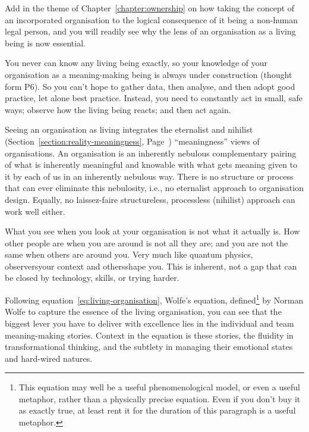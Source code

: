 Add in the theme of Chapter~\ref{chapter:ownership} on how taking the concept of an incorporated organisation to the logical consequence of it being a non-human legal person, and you will readily see why the lens of an organisation as a living being is now essential. 


You never can know any living being exactly, so your knowledge of your organisation as a meaning\hyp{}making being is always under construction (thought form P6). So you can't hope to gather data, then analyse, and then adopt good practice, let alone best practice. Instead, you need to constantly act in small, safe ways; observe how the living being reacts; and then act again\cite{snowden-cynefin, cynefin}.


Seeing an organisation as living integrates the eternalist and nihilist (Section~\ref{section:reality-meaningness}, Page~\pageref{section:reality-meaningness}) “meaningness” views of organisations. An organisation is an inherently nebulous complementary pairing of what is inherently meaningful and knowable with what gets meaning given to it by each of us in an inherently nebulous way. There is no structure or process that can ever eliminate this nebulosity, i.e., no eternalist approach to organisation design. Equally, no laissez-faire structureless, processless (nihilist) approach can work well either.


What you see when you look at your organisation is not what it actually is. How other people are when you are around is not all they are; and you are not the same when others are around you. Very much like quantum physics, observers\textemdash your context and others\textemdash shape you. This is inherent, not a gap that can be closed by technology, skills, or trying harder.


Following equation~\ref{eq:living-organisation}, Wolfe’s equation, defined\footnote{This equation may well be a useful phenomenological model, or even a useful metaphor, rather than a physically precise equation. Even if you don't buy it as exactly true, at least rent it for the duration of this paragraph is a useful metaphor.} by Norman Wolfe to capture the essence of the living organisation, you can see that the biggest lever you have to deliver with excellence lies in the individual and team meaning\hyp{}making stories. Context in the equation is these stories, the fluidity in transformational thinking, and the subtlety in managing their emotional states and hard-wired natures.


